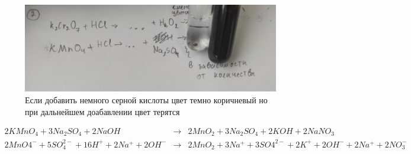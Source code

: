 \begin{figure}[h]
    \centering
    \includegraphics[width=1\linewidth]{Ex_3/Ex_3_2_2.jpg}
     \caption{Если добавить немного серной кислоты цвет темно коричневый но при дальнейшем доабавлении цвет терятся}
    \label{ex_3_2_2}
\end{figure}

\begin{eqnarray} 
    2KMnO_4 + 3Na_2SO_4 + 2NaOH &\xrightarrow{}& 
    2MnO_2 + 3Na_2SO_4 + 2KOH + 2NaNO_3\\
    2MnO4^- + 5SO_4^{2-} + 16H^+ + 2Na^+ + 2OH^- &\xrightarrow{}& 
    2MnO_2 + 3Na^+ + 3SO4^{2-} + 2K^+ + 2OH^- + 2Na^+ + 2NO_3^-
\end{eqnarray} 